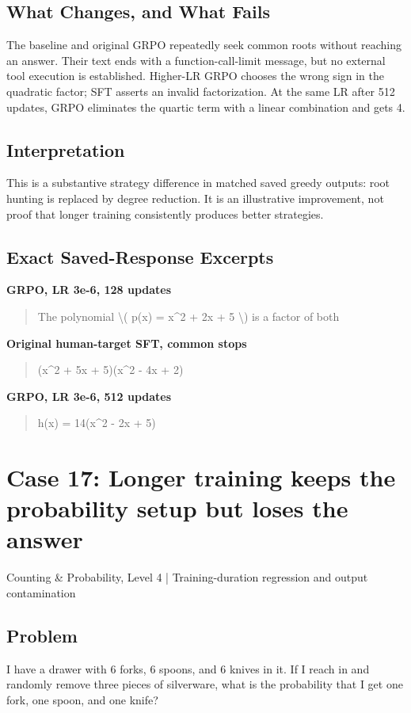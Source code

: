 \documentclass[10pt,letterpaper]{article}
\begin{document}
\subsection*{What Changes, and What Fails}
The baseline and original GRPO repeatedly seek common roots without reaching an answer. Their text ends with a function-call-limit message, but no external tool execution is established. Higher-LR GRPO chooses the wrong sign in the quadratic factor; SFT asserts an invalid factorization. At the same LR after 512 updates, GRPO eliminates the quartic term with a linear combination and gets 4.
\subsection*{Interpretation}
This is a substantive strategy difference in matched saved greedy outputs: root hunting is replaced by degree reduction. It is an illustrative improvement, not proof that longer training consistently produces better strategies.
\subsection*{Exact Saved-Response Excerpts}
\textbf{GRPO, LR 3e-6, 128 updates}
\begin{quote}\small\raggedright The polynomial \textbackslash{}( p(x) = x\textasciicircum{}2 + 2x + 5 \textbackslash{}) is a factor of both\end{quote}
\textbf{Original human-target SFT, common stops}
\begin{quote}\small\raggedright (x\textasciicircum{}2 + 5x + 5)(x\textasciicircum{}2 - 4x + 2)\end{quote}
\textbf{GRPO, LR 3e-6, 512 updates}
\begin{quote}\small\raggedright h(x) = 14(x\textasciicircum{}2 - 2x + 5)\end{quote}
\clearpage\section*{Case 17: Longer training keeps the probability setup but loses the answer}
Counting \& Probability, Level 4 | Training-duration regression and output contamination
\subsection*{Problem}
I have a drawer with 6 forks, 6 spoons, and 6 knives in it. If I reach in and randomly remove three pieces of silverware, what is the probability that I get one fork, one spoon, and one knife?
\end{document}

